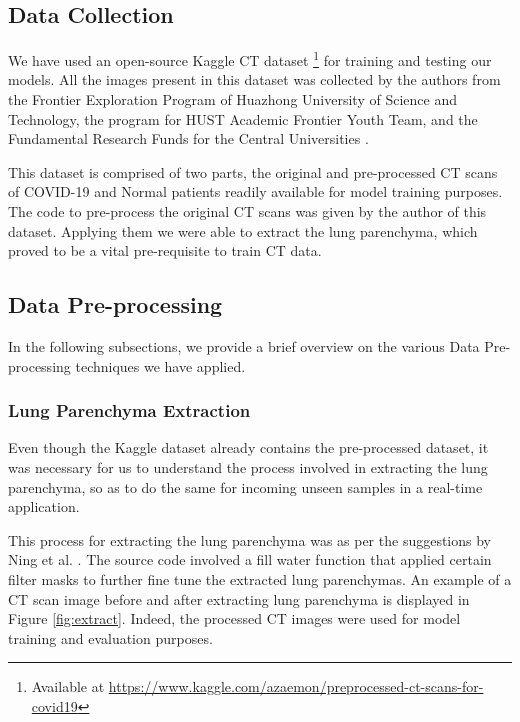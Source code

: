\subsection{Data Collection}

We have used an open-source Kaggle CT dataset \footnote{Available at \url{https://www.kaggle.com/azaemon/preprocessed-ct-scans-for-covid19}} for training and testing our models. All the images present in this dataset was collected by the authors from the Frontier Exploration Program of Huazhong University of Science and Technology, the program for HUST Academic Frontier Youth Team, and the Fundamental Research Funds for the Central Universities \cite{JCY+2020, ICT2019}. 

This dataset is comprised of two parts, the original and pre-processed CT scans of COVID-19 and Normal patients readily available for model training purposes. The code to pre-process the original CT scans was given by the author of this dataset. Applying them we were able to extract the lung parenchyma, which proved to be a vital pre-requisite to train CT data.

\subsection{Data Pre-processing}

In the following subsections, we provide a brief overview on the various Data Pre-processing techniques we have applied. 
\subsubsection{Lung Parenchyma Extraction}

Even though the Kaggle dataset already contains the pre-processed dataset, it was necessary for us to understand the process involved in extracting the lung parenchyma, so as to do the same for incoming unseen samples in a real-time application.

This process for extracting the lung parenchyma was as per the suggestions by Ning et al. \cite{ICT2019}. The source code involved a fill water function that applied certain filter masks to further fine tune the extracted lung parenchymas. An example of a CT scan image before and after extracting lung parenchyma is displayed in Figure \ref{fig:extract}. Indeed, the processed CT images were used for model training and evaluation purposes.

